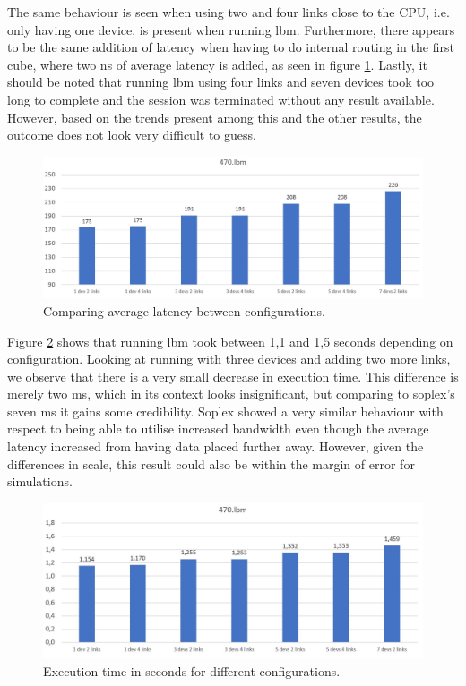 The same behaviour is seen when using two and four links close to the CPU, i.e. only having one device, is present when running lbm. Furthermore, there appears to be the same addition of latency when having to do internal routing in the first cube, where two ns of average latency is added, as seen in figure \ref{Memory-access-470-averages}. Lastly, it should be noted that running lbm using four links and seven devices took too long to complete and the session was terminated without any result available. However, based on the trends present among this and the other results, the outcome does not look very difficult to guess.
\bigskip

\begin{figure}[!ht]
    \centering
    \includegraphics[width=1.0\linewidth]{figure/470-averages.jpg}
    \caption{Comparing average latency between configurations.}
    \label{Memory-access-470-averages}
\end{figure}

Figure \ref{Memory-access-470-exectime} shows that running lbm took between 1,1 and 1,5 seconds depending on configuration. Looking at running with three devices and adding two more links, we observe that there is a very small decrease in execution time. This difference is merely two ms, which in its context looks insignificant, but comparing to soplex's seven ms it gains some credibility. Soplex showed a very similar behaviour with respect to being able to utilise increased bandwidth even though the average latency increased from having data placed further away. However, given the differences in scale, this result could also be within the margin of error for simulations.
\begin{figure}[!ht]
    \centering
    \includegraphics[width=1.0\linewidth]{figure/470-exectime.jpg}
    \caption{Execution time in seconds for different configurations.}
    \label{Memory-access-470-exectime}
\end{figure}

